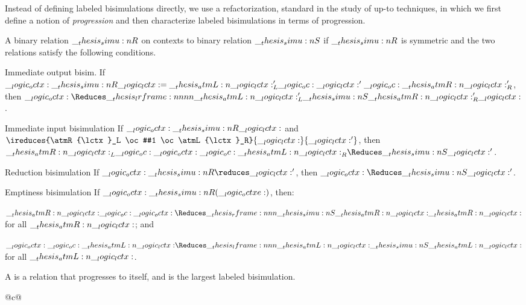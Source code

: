 Instead of defining labeled bisimulations directly, we use a refactorization, standard in the study of up-to techniques\autocite{Pous+Sangiorgi:CTTCS11}, in which we first define a notion of \emph{progression} and then characterize labeled bisimulations in terms of progression.
\begin{definition}
  A binary relation $\__thesis_simu:n {R}$ on contexts  to binary relation $\__thesis_simu:n {S}$ if $\__thesis_simu:n {R}$ is symmetric and the two relations satisfy the following conditions.
  \begin{thmdescription}[nosep]
  \item[Immediate output bisim.]
    If $\__logic_octx: \__thesis_simu:n {R} \__logic_lctx: = \__thesis_atmL:n {\__logic_lctx:}'_L \__logic_oc: \__logic_lctx:' \__logic_oc: \__thesis_atmR:n {\__logic_lctx:}'_R$, then $\octx \Reduces\lrframe{\atmL{\lctx}'_L}{\simu{S}}{\atmR{\lctx}'_R} \lctx$.
  \item[Immediate input bisimulation]
    If $\__logic_octx: \__thesis_simu:n {R} \__logic_lctx:$ and $\ireduces{\atmR{\lctx}_L \oc #1 \oc \atmL{\lctx}_R}{\lctx}{\lctx'}$, then\\$\atmR{\lctx}_L \oc \octx \oc \atmL{\lctx}_R \Reduces\simu{S} \lctx'$.
  \item[Reduction bisimulation]
    If $\octx \simu{R}\reduces \lctx'$, then $\octx \Reduces\simu{S} \lctx'$.
  \item[Emptiness bisimulation]
    If $\__logic_octx: \__thesis_simu:n {R} (\__logic_octxe:)$, then:
    \begin{itemize*}[label=, afterlabel=]
    \item $\atmR{\lctx} \oc \octx \Reduces\rframe{\simu{S}}{\atmR{\lctx}} \atmR{\lctx}$ for all $\__thesis_atmR:n {\__logic_lctx:}$; and
    \item $\octx \oc \atmL{\lctx} \Reduces\lframe{\atmL{\lctx}}{\simu{S}} \atmL{\lctx}$ for all $\__thesis_atmL:n {\__logic_lctx:}$.
    \end{itemize*}
  \end{thmdescription}
  A  is a relation that progresses to itself, and  is the largest labeled bisimulation.
  \begin{marginfigure}
    \begin{center}
      \begin{tabular}{@{}c@{}}
\end{tabular}
\end{center}
\end{marginfigure}
\end{definition}
